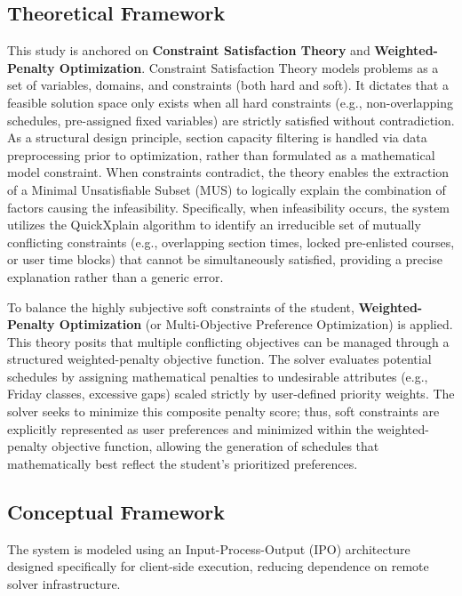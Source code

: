 \documentclass{icsthesis}
\begin{document}
\begin{mainmatter}
		\subsection{Theoretical Framework}
		
		This study is anchored on \textbf{Constraint Satisfaction Theory} and \textbf{Weighted-Penalty Optimization}. Constraint Satisfaction Theory models problems as a set of variables, domains, and constraints (both hard and soft). It dictates that a feasible solution space only exists when all hard constraints (e.g., non-overlapping schedules, pre-assigned fixed variables) are strictly satisfied without contradiction. As a structural design principle, section capacity filtering is handled via data preprocessing prior to optimization, rather than formulated as a mathematical model constraint. When constraints contradict, the theory enables the extraction of a Minimal Unsatisfiable Subset (MUS) to logically explain the combination of factors causing the infeasibility. Specifically, when infeasibility occurs, the system utilizes the QuickXplain algorithm to identify an irreducible set of mutually conflicting constraints (e.g., overlapping section times, locked pre-enlisted courses, or user time blocks) that cannot be simultaneously satisfied, providing a precise explanation rather than a generic error.
		
		To balance the highly subjective soft constraints of the student, \textbf{Weighted-Penalty Optimization} (or Multi-Objective Preference Optimization) is applied. This theory posits that multiple conflicting objectives can be managed through a structured weighted-penalty objective function. The solver evaluates potential schedules by assigning mathematical penalties to undesirable attributes (e.g., Friday classes, excessive gaps) scaled strictly by user-defined priority weights. The solver seeks to minimize this composite penalty score; thus, soft constraints are explicitly represented as user preferences and minimized within the weighted-penalty objective function, allowing the generation of schedules that mathematically best reflect the student's prioritized preferences.
		
		\subsection{Conceptual Framework}
		
		The system is modeled using an Input-Process-Output (IPO) architecture designed specifically for client-side execution, reducing dependence on remote solver infrastructure.
		

\end{mainmatter}
\end{document}
